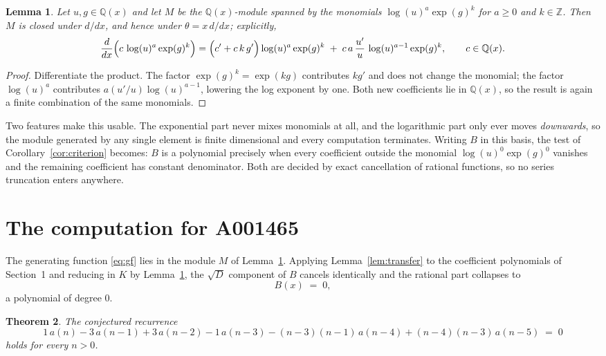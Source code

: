 \documentclass[11pt,a4paper]{article}
\theoremstyle{plain}
\newtheorem{theorem}{Theorem}
\newtheorem{lemma}[theorem]{Lemma}
\theoremstyle{definition}
\begin{document}
\begin{lemma}\label{lem:field}
Let $u,g\in\mathbb{Q}(x)$ and let $M$ be the $\mathbb{Q}(x)$-module spanned by the
monomials $\log(u)^{a}\exp(g)^{k}$ for $a\ge0$ and $k\in\mathbb{Z}$. Then $M$ is closed
under $d/dx$, and hence under $\theta=x\,d/dx$; explicitly,
\[
\frac{d}{dx}\Bigl(c\,\log(u)^{a}\exp(g)^{k}\Bigr)
=\Bigl(c'+c\,k\,g'\Bigr)\log(u)^{a}\exp(g)^{k}
\;+\;c\,a\,\frac{u'}{u}\,\log(u)^{a-1}\exp(g)^{k},
\qquad c\in\mathbb{Q}(x).
\]
\end{lemma}

\begin{proof}
Differentiate the product. The factor $\exp(g)^{k}=\exp(kg)$ contributes $kg'$ and does
not change the monomial; the factor $\log(u)^{a}$ contributes $a(u'/u)\log(u)^{a-1}$,
lowering the log exponent by one. Both new coefficients lie in $\mathbb{Q}(x)$, so the
result is again a finite combination of the same monomials.
\end{proof}

Two features make this usable. The exponential part never mixes monomials at all, and the
logarithmic part only ever moves \emph{downwards}, so the module generated by any single
element is finite dimensional and every computation terminates. Writing $B$ in this basis,
the test of Corollary~\ref{cor:criterion} becomes: $B$ is a polynomial precisely when every
coefficient outside the monomial $\log(u)^{0}\exp(g)^{0}$ vanishes and the remaining
coefficient has constant denominator. Both are decided by exact cancellation of rational
functions, so no series truncation enters anywhere.

\section{The computation for A001465}

The generating function \eqref{eq:gf} lies in the module $M$ of
Lemma~\ref{lem:field}.
Applying Lemma~\ref{lem:transfer} to the coefficient polynomials of Section~1 and reducing
in $K$ by Lemma~\ref{lem:field}, the $\sqrt{D}$ component of $B$ cancels identically and
the rational part collapses to
\[
B(x)\;=\;0 ,
\]
a polynomial of degree $0$.

\begin{theorem}
The conjectured recurrence
\[
1\,a(n) - 3\,a(n-1) + 3\,a(n-2) - 1\,a(n-3) -  \left(n - 3\right) \left(n - 1\right)\,a(n-4) + \left(n - 4\right) \left(n - 3\right)\,a(n-5) \;=\;0
\]
holds for every $n>0$.
\end{theorem}
\end{document}

